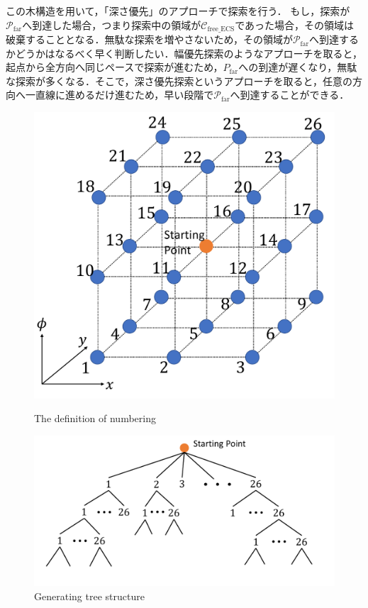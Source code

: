 \documentclass[a4paper,twoside,12pt,papersize, dvipdfmx]{iirthesis}
\begin{document}
この木構造を用いて，「深さ優先」のアプローチで探索を行う．
もし，探索が$\mathcal{P}_{\mathrm {far}}$へ到達した場合，つまり探索中の領域が$\mathcal{C}_{\mathrm{free\_ECS}}$であった場合，その領域は破棄することとなる．無駄な探索を増やさないため，その領域が$\mathcal{P}_{\mathrm {far}}$へ到達するかどうかはなるべく早く判断したい．幅優先探索のようなアプローチを取ると，起点から全方向へ同じペースで探索が進むため，$P_{\mathrm {far}}$への到達が遅くなり，無駄な探索が多くなる．そこで，深さ優先探索というアプローチを取ると，任意の方向へ一直線に進めるだけ進むため，早い段階で$\mathcal{P}_{\mathrm {far}}$へ到達することができる．\par

\begin{figure}[bt]
\centering
\begin{minipage}{0.4\hsize}
\includegraphics[width=0.9\hsize]{fig/3-new-planner/directiondef.pdf}
\caption{The definition of numbering}\label{fig::planner::numbering}
\end{minipage}\hfill
\begin{minipage}{0.59\hsize}
\includegraphics[width=\hsize]{fig/3-new-planner/treegraph.pdf}
\caption{Generating tree structure}\label{fig::planner::treegraph}
\end{minipage}
\end{figure}
\end{document}
